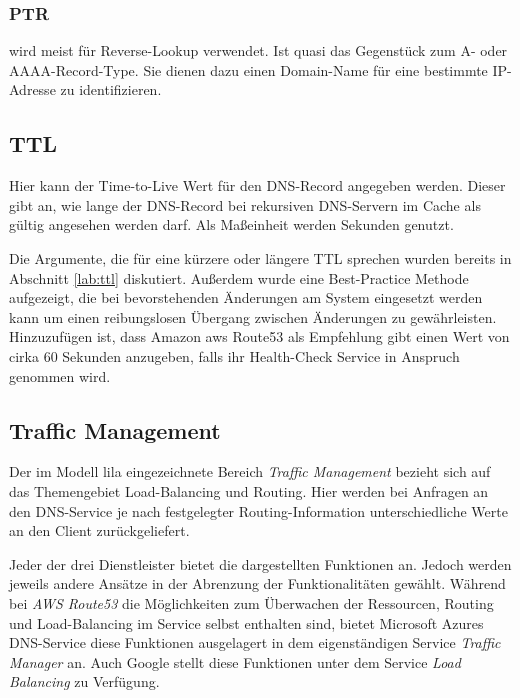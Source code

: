 \subsubsection{PTR}
wird meist für Reverse-Lookup verwendet. Ist quasi das Gegenstück zum A- oder AAAA-Record-Type. Sie dienen dazu einen Domain-Name für eine bestimmte IP-Adresse zu identifizieren.

\subsection{TTL}
Hier kann der Time-to-Live Wert für den DNS-Record angegeben werden. Dieser gibt an, wie lange der DNS-Record bei rekursiven DNS-Servern im Cache als gültig angesehen werden darf. Als Maßeinheit werden Sekunden genutzt. 

Die Argumente, die für eine kürzere oder längere TTL sprechen wurden bereits in Abschnitt \ref{lab:ttl} diskutiert. Außerdem wurde eine Best-Practice Methode aufgezeigt, die bei bevorstehenden Änderungen am System eingesetzt werden kann um einen reibungslosen Übergang zwischen Änderungen zu gewährleisten. Hinzuzufügen ist, dass Amazon aws Route53 als Empfehlung gibt einen Wert von cirka 60 Sekunden anzugeben, falls ihr Health-Check Service in Anspruch genommen wird.


\subsection{Traffic Management}
Der im Modell lila eingezeichnete Bereich \textit{Traffic Management} bezieht sich auf das Themengebiet Load-Balancing und Routing. Hier werden bei Anfragen an den DNS-Service je nach festgelegter Routing-Information unterschiedliche Werte an den Client zurückgeliefert. 

Jeder der drei Dienstleister bietet die dargestellten Funktionen an. Jedoch werden jeweils andere Ansätze in der Abrenzung der Funktionalitäten gewählt. Während bei \textit{AWS Route53} die Möglichkeiten zum Überwachen der Ressourcen, Routing und Load-Balancing im Service selbst enthalten sind, bietet Microsoft Azures DNS-Service diese Funktionen ausgelagert in dem eigenständigen Service \textit{Traffic Manager} an. Auch Google stellt diese Funktionen unter dem Service \textit{Load Balancing} zu Verfügung.

